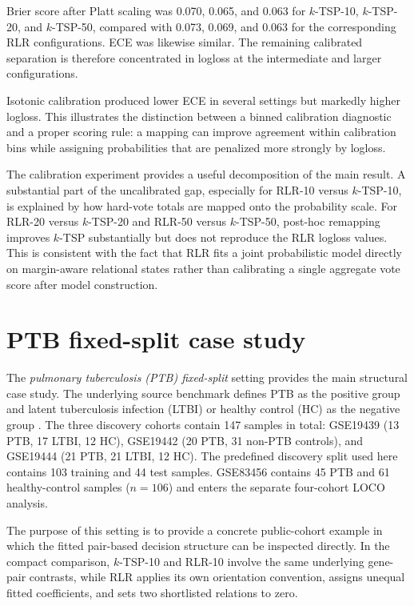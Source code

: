 \documentclass[11pt, a4paper]{article}
\begin{document}
Brier score after Platt scaling was 0.070, 0.065, and 0.063 for $k$-TSP-10, $k$-TSP-20, and $k$-TSP-50, compared with 0.073, 0.069, and 0.063 for the corresponding RLR configurations. ECE was likewise similar. The remaining calibrated separation is therefore concentrated in logloss at the intermediate and larger configurations.

Isotonic calibration produced lower ECE in several settings but markedly higher logloss. This illustrates the distinction between a binned calibration diagnostic and a proper scoring rule: a mapping can improve agreement within calibration bins while assigning probabilities that are penalized more strongly by logloss.

The calibration experiment provides a useful decomposition of the main result. A substantial part of the uncalibrated gap, especially for RLR-10 versus $k$-TSP-10, is explained by how hard-vote totals are mapped onto the probability scale. For RLR-20 versus $k$-TSP-20 and RLR-50 versus $k$-TSP-50, post-hoc remapping improves $k$-TSP substantially but does not reproduce the RLR logloss values. This is consistent with the fact that RLR fits a joint probabilistic model directly on margin-aware relational states rather than calibrating a single aggregate vote score after model construction.

\section{PTB fixed-split case study}

The \emph{pulmonary tuberculosis (PTB) fixed-split} setting provides the main structural case study. The underlying source benchmark defines PTB as the positive group and latent tuberculosis infection (LTBI) or healthy control (HC) as the negative group \cite{Wu2025}. The three discovery cohorts contain 147 samples in total: GSE19439 (13 PTB, 17 LTBI, 12 HC), GSE19442 (20 PTB, 31 non-PTB controls), and GSE19444 (21 PTB, 21 LTBI, 12 HC). The predefined discovery split used here contains 103 training and 44 test samples. GSE83456 contains 45 PTB and 61 healthy-control samples ($n=106$) and enters the separate four-cohort LOCO analysis.

The purpose of this setting is to provide a concrete public-cohort example in which the fitted pair-based decision structure can be inspected directly. In the compact comparison, $k$-TSP-10 and RLR-10 involve the same underlying gene-pair contrasts, while RLR applies its own orientation convention, assigns unequal fitted coefficients, and sets two shortlisted relations to zero.
\end{document}
